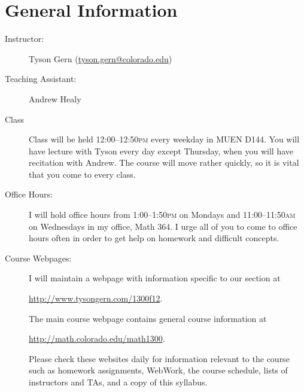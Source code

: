 \documentclass[11pt]{article}
\begin{document}
\drawtitle

\section*{General Information}
\begin{description}
\item[Instructor:] Tyson Gern
  (\href{mailto:tyson.gern@colorado.edu}{tyson.gern@colorado.edu})
\item[Teaching Assistant:] Andrew Healy
\item[Class] Class will be held 12:00--12:50\textsc{pm} every weekday
  in MUEN D144.  You will have lecture with Tyson every day except
  Thursday, when you will have recitation with Andrew.  The course will
  move rather quickly, so it is vital that you come to every class.
\item[Office Hours:] I will hold office hours from
  1:00--1:50\textsc{pm} on Mondays and 11:00--11:50\textsc{am} on
  Wednesdays in my office, Math 364.  I urge all of you to come to
  office hours often in order to get help on homework and difficult
  concepts.
\item[Course Webpages:] I will maintain a webpage with information
  specific to our section at
  \begin{center}
    \url{http://www.tysongern.com/1300f12}.
  \end{center}
  The main course webpage contains general course information at
  \begin{center}
      \url{http://math.colorado.edu/math1300}.
  \end{center}
  Please check these websites daily for information relevant to the
  course such as homework assignments, WebWork, the course schedule,
  lists of instructors and TAs, and a copy of this syllabus.
\end{description}
\end{document}
